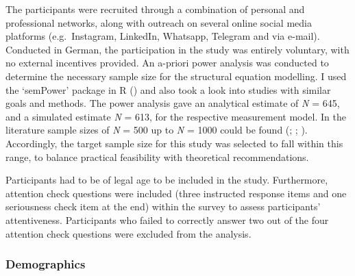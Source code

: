 \documentclass[
  12pt,
  a4paper,
  twoside]{article}
\begin{document}
The participants were recruited through a combination of personal and professional networks, along with outreach on several online social media platforms (e.g.~Instagram, LinkedIn, Whatsapp, Telegram and via e-mail). Conducted in German, the participation in the study was entirely voluntary, with no external incentives provided. An a-priori power analysis was conducted to determine the necessary sample size for the structural equation modelling. I used the `semPower' package in R () and also took a look into studies with similar goals and methods.
The power analysis gave an analytical estimate of \emph{N} = 645, and a simulated estimate \emph{N} = 613, for the respective measurement model.
In the literature sample sizes of \emph{N} = 500 up to \emph{N} = 1000 could be found (; ; ).
Accordingly, the target sample size for this study was selected to fall within this range, to balance practical feasibility with theoretical recommendations.

Participants had to be of legal age to be included in the study. Furthermore, attention check questions were included (three instructed response items and one seriousness check item at the end) within the survey to assess participants' attentiveness. Participants who failed to correctly answer two out of the four attention check questions were excluded from the analysis.

\subsubsection{Demographics}\label{demographics}
\end{document}
